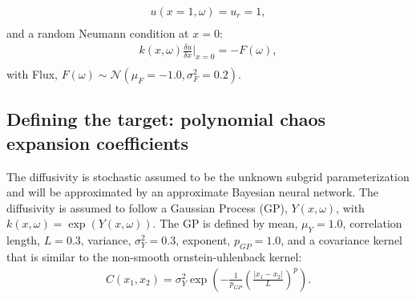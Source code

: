 \documentclass[letterpaper, 10 pt, conference, twocolumn]{ieeeconf}  %
\begin{document}
\begin{equation}
\begin{aligned}
  u(x=1,\omega) = u_r = 1, \\
\end{aligned}  
\label{eq:dirichlet}
\end{equation}
and a random Neumann condition at $x=0$:
\begin{equation}
\begin{aligned}
  k(x, \omega)\frac{\delta u}{\delta x}\rvert_{x=0} = -F(\omega), \\
\end{aligned}  
\label{eq:neumann}
\end{equation}
with Flux, $F(\omega) \sim \mathcal N(\mu_F=-1.0, \sigma_F^2=0.2)$. 

\subsection{Defining the target: polynomial chaos expansion coefficients}\label{sec:sde}
The diffusivity is stochastic assumed to be the unknown subgrid parameterization and will be approximated by an approximate Bayesian neural network. The diffusivity is assumed to follow a Gaussian Process (GP), $Y(x,\omega)$, with $k(x,\omega)=\exp(Y(x, \omega))$. The GP is defined by mean, $\mu_Y=1.0$, correlation length, $L=0.3$, variance, $\sigma_Y^2=0.3$, exponent, $p_{GP}=1.0$, and a covariance kernel that is similar to the non-smooth ornstein-uhlenback kernel:
\begin{equation}
\begin{aligned}
  C(x_1, x_2) = \sigma_Y^2 \exp(-\frac{1}{p_{GP}} (\frac{\lvert x_1 - x_2 \rvert}{L})^p).\\
\end{aligned}  
\label{eq:kernel}
\end{equation}
\end{document}
